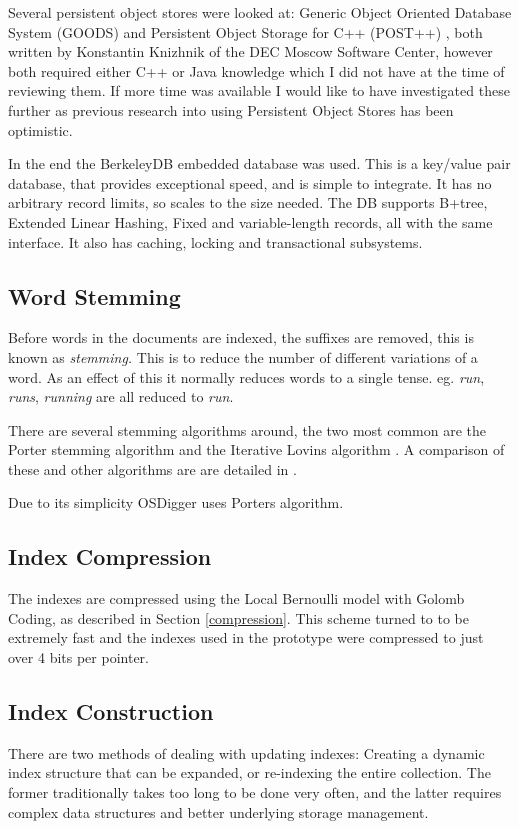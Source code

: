 Several persistent object stores were looked at: Generic Object Oriented Database System (GOODS) and Persistent Object Storage for C++ (POST++) \cite{www:goods} , both written by Konstantin Knizhnik of the DEC Moscow Software Center, however both required either C++ or Java knowledge which I did not have at the time of reviewing them.  If more time was available I would like to have investigated these further as previous research into using Persistent Object Stores has been optimistic.  

In the end the BerkeleyDB \cite{olson99,www:berkeleydb} embedded database was used.  This is a key/value pair database, that provides exceptional speed, and is simple to integrate.  It has no arbitrary record limits, so scales to the size needed.  The DB supports B+tree, Extended Linear Hashing, Fixed and variable-length records, all with the same interface.  It also has caching, locking and transactional subsystems.

\subsection{Word Stemming}
Before words in the documents are indexed, the suffixes are removed, this is known as \emph{stemming.}  This is to reduce the number of different variations of a word.  As an effect of this it normally reduces words to a single tense. eg. \emph{run}, \emph{runs}, \emph{running} are all reduced to \emph{run}.

There are several stemming algorithms around, the two most common are the Porter stemming algorithm \cite{porter80} and the Iterative Lovins algorithm \cite{lovins68}.  A comparison of these and other algorithms are are detailed in \cite{frakes-stemming}.

Due to its simplicity OSDigger uses Porters algorithm.

\subsection{Index Compression}
The indexes are compressed using the Local Bernoulli model with Golomb Coding, as described in Section \ref{compression}.  This scheme turned to to be extremely fast and the indexes used in the prototype were compressed to just over 4 bits per pointer.

\subsection{Index Construction}
There are two methods of dealing with updating indexes: Creating a dynamic index structure that can be expanded, or re-indexing the entire collection.  The former traditionally takes too long to be done very often, and the latter requires complex data structures and better underlying storage management.

